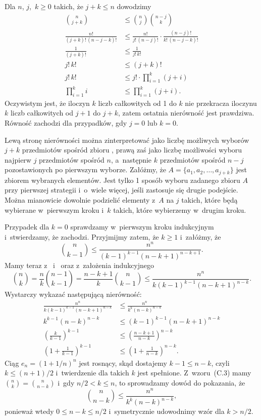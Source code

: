 \exercise{} %
Dla $n$, $j$,~$k\ge0$ takich, że $j+k\le n$ dowodzimy
\begin{align*}
	\binom{n}{j+k} &\le \binom{n}{j}\binom{n-j}{k} \\
	\frac{n!}{(j+k)!\,(n-j-k)!} &\le \frac{n!}{j!\,(n-j)!}\cdot\frac{(n-j)!}{k!\,(n-j-k)!} \\
	\frac{1}{(j+k)!} &\le \frac{1}{j!\,k!} \\
	j!\,k! &\le (j+k)! \\
	j!\,k! &\le j!\cdot\prod_{i=1}^k(j+i) \\
	\prod_{i=1}^ki &\le \prod_{i=1}^k(j+i).
\end{align*}
Oczywistym jest, że iloczyn $k$ liczb całkowitych od 1 do $k$ nie przekracza iloczynu $k$ liczb całkowitych od $j+1$ do $j+k$, zatem ostatnia nierówność jest prawdziwa. Równość zachodzi dla przypadków, gdy $j=0$ lub $k=0$.

Lewą stronę nierówności można zinterpretować jako liczbę możliwych wyborów $j+k$ przedmiotów spośród zbioru , prawą zaś jako liczbę możliwości wyboru najpierw $j$ przedmiotów spośród $n$, a~następnie $k$ przedmiotów spośród $n-j$ pozostawionych po pierwszym wyborze. Załóżmy, że $A=\{a_1,a_2,\dots,a_{j+k}\}$ jest zbiorem wybranych elementów. Jest tylko 1 sposób wyboru zadanego zbioru $A$ przy pierwszej strategii i~o~wiele więcej, jeśli zastosuje się drugie podejście. Można mianowicie dowolnie podzielić elementy z~$A$ na $j$ takich, które będą wybierane w~pierwszym kroku i~$k$ takich, które wybierzemy w~drugim kroku.

\exercise{} %
Przypadek dla $k=0$ sprawdzamy w~pierwszym kroku indukcyjnym i~stwierdzamy, że zachodzi. Przyjmijmy zatem, że $k\ge1$ i~załóżmy, że
\[
	\binom{n}{k-1} \le \frac{n^n}{(k-1)^{k-1}(n-k+1)^{n-k+1}}.
\]
Mamy teraz z~ i~ oraz z~założenia indukcyjnego
\[
	\binom{n}{k} = \frac{n}{k}\binom{n-1}{k-1} = \frac{n-k+1}{k}\binom{n}{k-1} \le \frac{n^n}{k(k-1)^{k-1}(n-k+1)^{n-k}}.
\]
Wystarczy wykazać następującą nierówność:
\begin{align*}
	\frac{n^n}{k(k-1)^{k-1}(n-k+1)^{n-k}} &\le \frac{n^n}{k^k(n-k)^{n-k}} \\[1mm]
	k^{k-1}(n-k)^{n-k} &\le (k-1)^{k-1}(n-k+1)^{n-k} \\[1mm]
	\left(\frac{k}{k-1}\right)^{k-1} &\le \left(\frac{n-k+1}{n-k}\right)^{n-k} \\
	\left(1+\frac{1}{k-1}\right)^{k-1} &\le \left(1+\frac{1}{n-k}\right)^{n-k}. \tag{$*$}\label{eq:C.1-12}
\end{align*}
Ciąg $e_n={(1+1/n)}^n$ jest rosnący, skąd dostajemy $k-1\le n-k$, czyli $k\le(n+1)/2$ i~twierdzenie dla takich $k$ jest spełnione. Z~wzoru~(C.3) mamy $\binom{n}{k}=\binom{n}{n-k}$ i~gdy $n/2<k\le n$, to sprowadzamy dowód do pokazania, że
\[
	\binom{n}{n-k} \le \frac{n^n}{k^k(n-k)^{n-k}},
\]
ponieważ wtedy $0\le n-k\le n/2$ i~symetrycznie udowodnimy wzór dla $k>n/2$.

